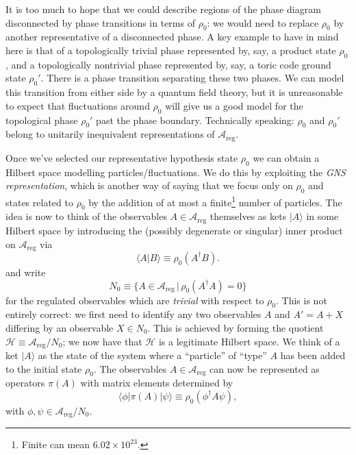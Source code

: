 \documentclass[11pt]{amsart}
\theoremstyle{plain}%
\theoremstyle{definition}
\theoremstyle{remark}
\begin{document}
It is too much to hope that we could describe regions of the phase diagram disconnected by phase transitions in terms of $\rho_0$: we would need to replace $\rho_0$ by another representative of a disconnected phase. A key example to have in mind here is that of a topologically trivial phase represented by, say, a product state $\rho_0$, and a topologically nontrivial phase represented by, say, a toric code \cite{kitaev_fault-tolerant_2003} ground state $\rho_0'$. There is a phase transition separating these two phases. We can model this transition from either side by a quantum field theory, but it is unreasonable to expect that fluctuations around $\rho_0$ will give us a good model for the topological phase $\rho_0'$ past the phase boundary. Technically speaking: $\rho_0$ and $\rho_0'$ belong to unitarily inequivalent representations of $\mathcal{A}_{\text{reg}}$. 

Once we've selected our representative hypothesis state $\rho_0$ we can obtain a Hilbert space modelling particles/fluctuations. We do this by exploiting the \emph{GNS representation}, which is another way of saying that we focus only on $\rho_0$ and states related to $\rho_0$ by the addition of at most a finite\footnote{Finite can mean $6.02\times 10^{23}$.} number of particles. The idea is now to think of the observables $A\in \mathcal{A}_{\text{reg}}$ themselves as kets $|A\rangle$ in some Hilbert space by introducing the (possibly degenerate or singular) inner product on $\mathcal{A}_{\text{reg}}$ via
\begin{equation}
	\langle A|B\rangle \equiv \rho_0 (A^\dag B).
\end{equation}
and write
\begin{equation}
	N_{0} \equiv \{A\in \mathcal{A}_{\text{reg}}\,|\, \rho_0(A^\dag A)=0\}
\end{equation}
for the regulated observables which are \emph{trivial} with respect to $\rho_0$. This is not entirely correct: we first need to identify any two observables $A$ and $A' = A + X$ differing by an observable $X\in N_0$. This is achieved by forming the quotient $\mathcal{H} \equiv \mathcal{A}_{\text{reg}}/N_0$; we now have that $\mathcal{H}$ is a legitimate Hilbert space. We think of a ket $|A\rangle$ as the state of the system where a ``particle'' of ``type'' $A$ has been added to the initial state $\rho_0$. The observables $A\in\mathcal{A}_{\text{reg}}$ can now be represented as operators $\pi(A)$ with matrix elements determined by
\begin{equation}
	\langle \phi|\pi(A)|\psi\rangle \equiv \rho_0(\phi^\dag A \psi),
\end{equation}
with $\phi,\psi \in  \mathcal{A}_{\text{reg}}/N_0$. 
\end{document}
